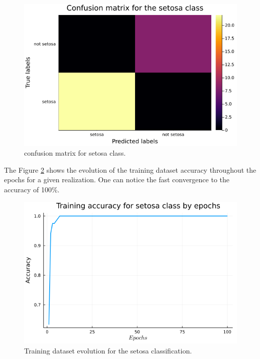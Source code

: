 \documentclass[12pt,a4paper]{article}
\begin{document}
\begin{figure}[H]
    \centering
    \includegraphics[scale=0.35]{../trab1 (single perceptron)/figs/setosa-confusion-matrix.png}
    \caption{confusion matrix for setosa class.}
    \label{fig:confusion-matrix-setosa}
\end{figure}

The Figure \ref{fig:setosa-training-evolution} shows the evolution of the training dataset accuracy throughout the epochs for a given realization. One can notice the fast convergence to the accuracy of 100\%.

\begin{figure}[H]
    \centering
    \includegraphics[scale=0.35]{../trab1 (single perceptron)/figs/accuracy-by-epochs-for-setosa.png}
    \caption{Training dataset evolution for the setosa classification.}
    \label{fig:setosa-training-evolution}
\end{figure}
\end{document}
